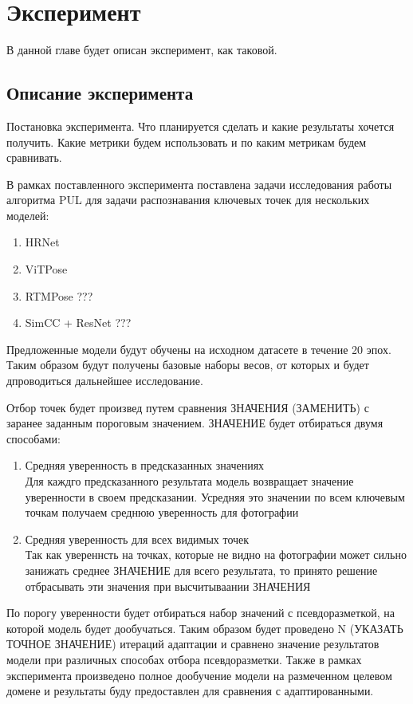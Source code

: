 \section{Эксперимент}
\label{sec:Chapter5} 

В данной главе будет описан эксперимент, как таковой.

\subsection{Описание эксперимента}

Постановка эксперимента. Что планируется сделать и какие результаты хочется получить. Какие метрики будем использовать и по каким метрикам будем сравнивать.

В рамках поставленного эксперимента поставлена задачи исследования работы алгоритма PUL для задачи распознавания ключевых точек для нескольких моделей:
\begin{enumerate}
\item HRNet
\item ViTPose
\item RTMPose ???
\item SimCC + ResNet ???
\end{enumerate}

Предложенные модели будут обучены на исходном датасете в течение 20 эпох. Таким образом будут получены базовые наборы весов, от которых и будет дпроводиться дальнейшее исследование.

Отбор точек будет произвед путем сравнения ЗНАЧЕНИЯ (ЗАМЕНИТЬ) с заранее заданным пороговым значением. ЗНАЧЕНИЕ будет отбираться двумя способами:
\begin{enumerate}
\item Средняя уверенность в предсказанных значениях\\
Для каждго предсказанного результата модель возвращает значение уверенности в своем предсказании. Усредняя это значении по всем ключевым точкам получаем среднюю уверенность для фотографии
\item Средняя уверенность для всех видимых точек\\
Так как увереннсть на точках, которые не видно на фотографии может сильно занижать среднее ЗНАЧЕНИЕ для всего результата, то принято решение отбрасывать эти значения при высчитываании ЗНАЧЕНИЯ
\end{enumerate}

По порогу уверенности будет отбираться набор значений с псевдоразметкой, на которой модель будет дообучаться. Таким образом будет проведено N (УКАЗАТЬ ТОЧНОЕ ЗНАЧЕНИЕ) итераций адаптации и сравнено значение результатов модели при различных способах отбора псевдоразметки. Также в рамках эксперимента произведено полное дообучение модели на размеченном целевом домене и результаты буду предоставлен для сравнения с адаптированными.

